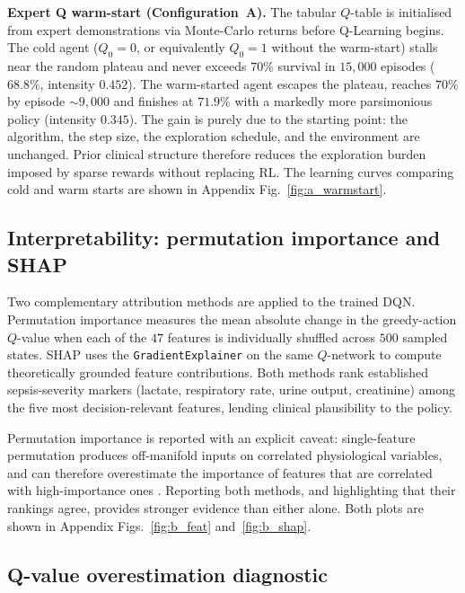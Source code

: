 \documentclass[11pt,a4paper]{article}
\begin{document}
\textbf{Expert Q warm-start (Configuration~A).} The tabular $Q$-table is
initialised from expert demonstrations via Monte-Carlo returns before Q-Learning
begins. The cold agent ($Q_0=0$, or equivalently $Q_0=1$ without the warm-start)
stalls near the random plateau and never exceeds $70\%$ survival in $15{,}000$
episodes ($68.8\%$, intensity $0.452$). The warm-started agent escapes the plateau,
reaches $70\%$ by episode $\sim9{,}000$ and finishes at $\mathbf{71.9\%}$ with a
markedly more parsimonious policy (intensity $0.345$). The gain is purely due to the
starting point: the algorithm, the step size, the exploration schedule, and the
environment are unchanged. Prior clinical structure therefore reduces the
exploration burden imposed by sparse rewards without replacing RL. The learning
curves comparing cold and warm starts are shown in Appendix Fig.~\ref{fig:a_warmstart}.

\subsection{Interpretability: permutation importance and SHAP}
\label{sec:interp}

Two complementary attribution methods are applied to the trained DQN. Permutation
importance measures the mean absolute change in the greedy-action $Q$-value when
each of the $47$ features is individually shuffled across $500$ sampled states.
SHAP \cite{lundberg2017} uses the \texttt{GradientExplainer} on the same $Q$-network
to compute theoretically grounded feature contributions. Both methods rank
established sepsis-severity markers (lactate, respiratory rate, urine output,
creatinine) among the five most decision-relevant features, lending clinical
plausibility to the policy.

Permutation importance is reported with an explicit caveat: single-feature
permutation produces off-manifold inputs on correlated physiological variables, and
can therefore overestimate the importance of features that are correlated with
high-importance ones \cite{hooker2021}. Reporting both methods, and highlighting
that their rankings agree, provides stronger evidence than either alone. Both
plots are shown in Appendix Figs.~\ref{fig:b_feat} and~\ref{fig:b_shap}.

\subsection{Q-value overestimation diagnostic}
\label{sec:overest}
\end{document}
